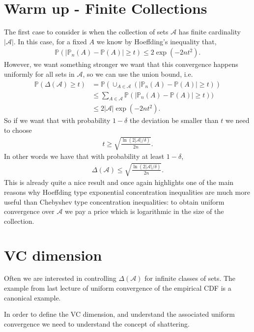 \documentclass[twoside,12pt]{article}
\begin{document}
\section{Warm up - Finite Collections}
The first case to consider is when the collection of sets $\mathcal{A}$ has finite cardinality $|\mathcal{A}|$. In this case, for a fixed $A$ we know by Hoeffding's inequality that,
\begin{align*}
\mathbb{P}( |\mathbb{P}_n(A) - \mathbb{P}(A)| \geq t) \leq 2 \exp (-2 n t^2).
\end{align*}
However, we want something stronger we want that this convergence happens uniformly for all sets in $\mathcal{A}$, so we can use the union bound, i.e.
\begin{align*}
\mathbb{P}( \Delta(\mathcal{A}) \geq t) &= 
\mathbb{P}( \cup_{A \in \mathcal{A}} ( |\mathbb{P}_n(A) - \mathbb{P}(A)| \geq t)) \\
&\leq \sum_{A \in \mathcal{A}} \mathbb{P}( |\mathbb{P}_n(A) - \mathbb{P}(A)| \geq t)) \\
&\leq 2 |\mathcal{A}| \exp( - 2 n t^2). 
\end{align*}
So if we want that with probability $1 - \delta$ the deviation be smaller than $t$ we need to choose 
\begin{align*}
t \geq \sqrt{ \frac{ \ln (2|\mathcal{A}|/\delta) }{2n} }.
\end{align*}
In other words we have that with probability at least $1 - \delta$,
\begin{align*}
\Delta(\mathcal{A}) \leq \sqrt{ \frac{ \ln (2|\mathcal{A}|/\delta) }{2n} }.
\end{align*}
This is already quite a nice result and once again highlights one of the main reasons why Hoeffding type exponential concentration inequalities are much more useful than Chebyshev type concentration inequalities: to obtain uniform convergence over $\mathcal{A}$ we pay a price which is logarithmic in the size of the collection. 

\section{VC dimension}
Often we are interested in controlling $\Delta(\mathcal{A})$ for infinite classes of sets. The example from last lecture of uniform convergence of the empirical CDF is a canonical example.

In order to define the VC dimension, and understand the associated uniform convergence we need to understand the concept of shattering.
\end{document}
